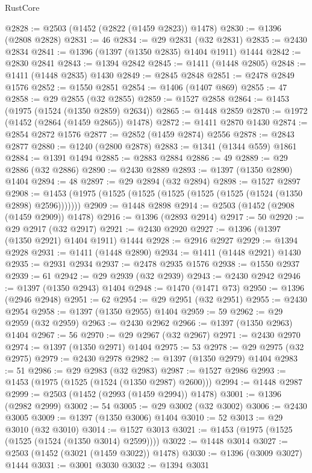 \begin{lexlean}{RustCore}
\begin{coremodule}
{\begin{coremodule}
{{{{{{{{{{{{{{{{{{{{{{{{{{{{{{{{{{{{{{{{{{{{{@2828 := @2503 (@1452 (@2822 (@1459 @2823)) @1478)
@2830 := @1396 (@2808 @2828)
@2831 := 46
@2834 := @29 @2831 (@32 @2831)
@2835 := @2430 @2834
@2841 := @1396 (@1397 (@1350 @2835) @1404 @1911) @1444
@2842 := @2830 @2841
@2843 := @1394 @2842
@2845 := @1411 (@1448 @2805)
@2848 := @1411 (@1448 @2835) @1430
@2849 := @2845 @2848
@2851 := @2478 @2849 @1576
@2852 := @1550 @2851
@2854 := @1406 (@1407 @869)
@2855 := 47
@2858 := @29 @2855 (@32 @2855)
@2859 := @1527 @2858
@2864 := @1453 (@1975 (@1524 (@1350 @2859) @2634))
@2865 := @1448 @2859
@2870 := @1972 (@1452 (@2864 (@1459 @2865)) @1478)
@2872 := @1411 @2870 @1430
@2874 := @2854 @2872 @1576
@2877 := @2852 (@1459 @2874) @2556
@2878 := @2843 @2877
@2880 := @1240 (@2800 @2878)
@2883 := @1341 (@1344 @559) @1861
@2884 := @1391 @1494
@2885 := @2883 @2884
@2886 := 49
@2889 := @29 @2886 (@32 @2886)
@2890 := @2430 @2889
@2893 := @1397 (@1350 @2890) @1404
@2894 := 48
@2897 := @29 @2894 (@32 @2894)
@2898 := @1527 @2897
@2908 := @1453 (@1975 (@1525 (@1525 (@1525 (@1525 (@1525 (@1524 (@1350 @2898) @2596)))))))
@2909 := @1448 @2898
@2914 := @2503 (@1452 (@2908 (@1459 @2909)) @1478)
@2916 := @1396 (@2893 @2914)
@2917 := 50
@2920 := @29 @2917 (@32 @2917)
@2921 := @2430 @2920
@2927 := @1396 (@1397 (@1350 @2921) @1404 @1911) @1444
@2928 := @2916 @2927
@2929 := @1394 @2928
@2931 := @1411 (@1448 @2890)
@2934 := @1411 (@1448 @2921) @1430
@2935 := @2931 @2934
@2937 := @2478 @2935 @1576
@2938 := @1550 @2937
@2939 := 61
@2942 := @29 @2939 (@32 @2939)
@2943 := @2430 @2942
@2946 := @1397 (@1350 @2943) @1404
@2948 := @1470 (@1471 @73)
@2950 := @1396 (@2946 @2948)
@2951 := 62
@2954 := @29 @2951 (@32 @2951)
@2955 := @2430 @2954
@2958 := @1397 (@1350 @2955) @1404
@2959 := 59
@2962 := @29 @2959 (@32 @2959)
@2963 := @2430 @2962
@2966 := @1397 (@1350 @2963) @1404
@2967 := 56
@2970 := @29 @2967 (@32 @2967)
@2971 := @2430 @2970
@2974 := @1397 (@1350 @2971) @1404
@2975 := 53
@2978 := @29 @2975 (@32 @2975)
@2979 := @2430 @2978
@2982 := @1397 (@1350 @2979) @1404
@2983 := 51
@2986 := @29 @2983 (@32 @2983)
@2987 := @1527 @2986
@2993 := @1453 (@1975 (@1525 (@1524 (@1350 @2987) @2600)))
@2994 := @1448 @2987
@2999 := @2503 (@1452 (@2993 (@1459 @2994)) @1478)
@3001 := @1396 (@2982 @2999)
@3002 := 54
@3005 := @29 @3002 (@32 @3002)
@3006 := @2430 @3005
@3009 := @1397 (@1350 @3006) @1404
@3010 := 52
@3013 := @29 @3010 (@32 @3010)
@3014 := @1527 @3013
@3021 := @1453 (@1975 (@1525 (@1525 (@1524 (@1350 @3014) @2599))))
@3022 := @1448 @3014
@3027 := @2503 (@1452 (@3021 (@1459 @3022)) @1478)
@3030 := @1396 (@3009 @3027) @1444
@3031 := @3001 @3030
@3032 := @1394 @3031
}}}}}}}}}}}}}}}}}}}}}}}}}}}}}}}}}}}}}}}}}}}}}
\end{coremodule}}
\end{coremodule}
\end{lexlean}
